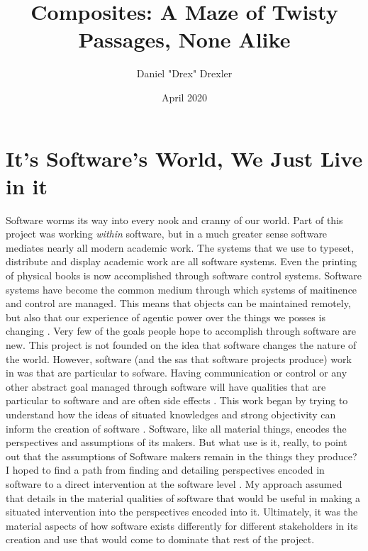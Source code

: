 \documentclass[a4paper,man,natbib]{apa6}
\title{Composites: A Maze of Twisty Passages, None Alike}
\author{Daniel "Drex" Drexler}
\affiliation{Center for Science, Technology and Society at Drexel University}
\date{April 2020}
\begin{document}
   \maketitle
   \section*{It's Software's World, We Just Live in it}
   Software worms its way into every nook and cranny of our world. Part of this project was working \textit{within} software, but in a much greater sense software mediates nearly all modern academic work. The systems that we use to typeset, distribute and display academic work are all software systems. Even the printing of physical books is now accomplished through software control systems. Software systems have become the common medium through which systems of maitinence and control are managed. This means that objects can be maintained remotely, but also that our experience of agentic power over the things we posses is changing \citep{Koebler2017-dt}. Very few of the goals people hope to accomplish through software are new. This project is not founded on the idea that software changes the nature of the world. However, software (and the \glspl{sa} that software projects produce) work in was that are particular to sofware. Having communication or control or any other abstract goal managed through software will have qualities that are particular to software and are often side effects \citep{Mackenzie2006-hb, Kitchin2011-af}. This work began by trying to understand how the ideas of situated knowledges and strong objectivity can inform the creation of software \citep{Harding1992-od,Haraway1988-nh}. Software, like all material things, encodes the perspectives and assumptions of its makers. But what use is it, really, to point out that the assumptions of Software makers remain in the things they produce? I hoped to find a path from finding and detailing perspectives encoded in software to a direct intervention at the software level \citep{Zuiderent-Jerak2015-go}. My approach assumed that details in the material qualities of software that would be useful in making a situated intervention into the perspectives encoded into it. Ultimately, it was the material aspects of how software exists differently for different stakeholders in its creation and use that would come to dominate that rest of the project.
\end{document}
